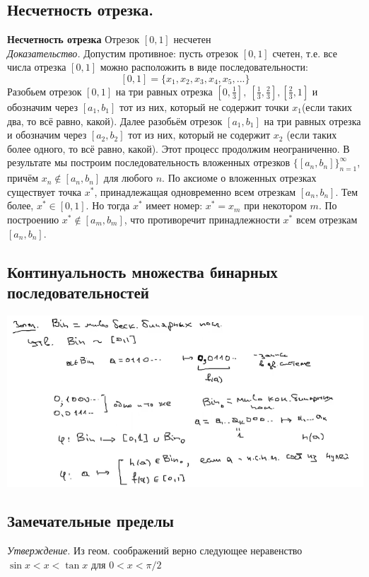 \subsection{Несчетность отрезка. }
\textbf{Несчетность отрезка} Отрезок $[0, 1]$ несчетен\\
\textit{Доказательство.} Допустим противное: пусть отрезок $[0, 1]$ счетен, т.е. все числа отрезка $[0, 1]$ можно расположить в виде последовательности: $$[0,1] = \{x_1, x_2, x_3, x_4, x_5, ...\}$$
Разобьем отрезок $[0,1]$ на три равных отрезка $[0, \frac{1}{3}],\ [\frac{1}{3}, \frac{2}{3}], [\frac{2}{3}, 1]$ и обозначим через $[a_1, b_1]$ тот из них, который не содержит точки $x_1$(если таких два, то всё равно, какой). Далее разобьём отрезок $[a_1, b_1]$ на три равных отрезка и обозначим через $[a_2, b_2]$ тот из них, который не содержит $x_2$ (если таких более одного, то всё равно, какой). Этот процесс продолжим неограниченно. В результате мы построим последовательность вложенных отрезков $\{[a_n, b_n]\}^{\infty}_{n=1}$, причём $x_n \notin [a_n, b_n]$ для любого $n$. По аксиоме о вложенных отрезках существует точка $x^*$, принадлежащая одновременно всем отрезкам $[a_n, b_n]$. Тем более, $x^* \in [0, 1]$. Но тогда $x^*$ имеет номер: $x^* = x_m$ при некотором $m$. По построению $x^* \notin [a_m, b_m]$, 
что противоречит принадлежности $x^*$ всем отрезкам $[a_n, b_n]$.
\subsection{Континуальность множества бинарных последовательностей}

\includegraphics[scale=0.7]{Images/Бин.png}


\newpage
{}
\subsection{Замечательные пределы}
\textit{Утверждение.} Из геом. соображений верно следующее неравенство $\sin{x} < x < \tan{x}$ для $0 < x < \pi/2$\\

